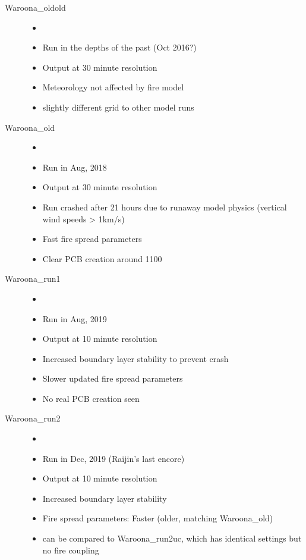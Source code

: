     \begin{description}
      \item [Waroona\_oldold]
      \begin{itemize}
        \item [] %
        \item Run in the depths of the past (Oct 2016?)
        \item Output at 30 minute resolution
        \item Meteorology not affected by fire model
        \item slightly different grid to other model runs
      \end{itemize}
      \item [Waroona\_old]
      
      \begin{itemize}
        \item []
        \item Run in Aug, 2018
        \item Output at 30 minute resolution
        \item Run crashed after 21 hours due to runaway model physics (vertical wind speeds > 1km/s)
        \item Fast fire spread parameters
        \item Clear PCB creation around 1100
      \end{itemize}
      
      \item [Waroona\_run1]
      \begin{itemize}
        \item []
        \item Run in Aug, 2019
        \item Output at 10 minute resolution
        \item Increased boundary layer stability to prevent crash
        \item Slower updated fire spread parameters
        \item No real PCB creation seen
      \end{itemize}
      
      \item [Waroona\_run2]
      \begin{itemize}
        \item []
        \item Run in Dec, 2019 (Raijin's last encore)
        \item Output at 10 minute resolution
        \item Increased boundary layer stability
        \item Fire spread parameters: Faster (older, matching Waroona\_old)
        \item can be compared to Waroona\_run2uc, which has identical settings but no fire coupling
      \end{itemize}
      

\end{description}
